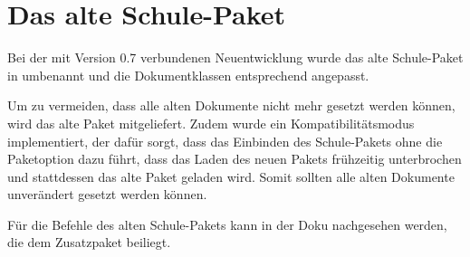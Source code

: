 \section{Das alte Schule-Paket}
\label{paket:schulealt}

	Bei der mit Version 0.7 verbundenen Neuentwicklung wurde das alte 
	Schule-Paket in  umbenannt und die Dokumentklassen
	entsprechend angepasst.
	
	Um zu vermeiden, dass alle alten Dokumente nicht mehr gesetzt
	werden können, wird das alte Paket mitgeliefert. Zudem wurde ein 
	Kompatibilitätsmodus implementiert, der dafür sorgt, dass das
	Einbinden des Schule-Pakets ohne die Paketoption  dazu
	führt, dass das Laden des neuen Pakets frühzeitig unterbrochen
	und stattdessen das alte Paket geladen wird. Somit sollten alle alten Dokumente unverändert gesetzt werden können.
	
	Für die Befehle des alten Schule-Pakets kann in der Doku nachgesehen
	werden, die dem Zusatzpaket  beiliegt.
	
